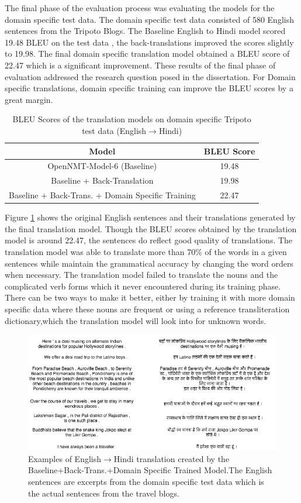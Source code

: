 The final phase of the evaluation process was evaluating the models for the domain specific test data. The domain specific test data consisted of 580 English sentences from the Tripoto Blogs. The Baseline English to Hindi model scored 19.48 BLEU on the test data , the back-translations improved the scores slightly to 19.98. The final domain specific translation model obtained a BLEU score of 22.47 which is a significant improvement. These results of the final phase of evaluation addressed the research question posed in the dissertation. For Domain specific translations, domain specific training can improve the BLEU scores by a great margin. 
\begin{table}[h!]
\centering
 \begin{tabular}{ |c|c| } 
  \hline Model & BLEU Score  \\ 
  \hline  OpenNMT-Model-6 (Baseline) &   19.48\\
  Baseline + Back-Translation & 19.98\\
  Baseline + Back-Trans. + Domain Specific Training & 22.47 \\
  \hline
 \end{tabular}
\caption{BLEU Scores of the translation models on domain specific Tripoto test data (English$\rightarrow$Hindi)}
\label{bleutable3}
\end{table}

Figure \ref{translations1} shows the original English sentences and their translations generated by the final translation model. Though the BLEU scores obtained by the translation model is around 22.47, the sentences do reflect good quality of translations. The translation model was able to translate more than 70\% of the words in a given sentences while maintain the grammatical accuracy by changing the word orders when necessary. The translation model failed to translate the nouns and the complicated verb forms which it never encountered during its training phase. There can be two ways to make it better, either by training it with more domain specific data where these nouns are frequent or using a reference transliteration dictionary,which the translation model will look into for unknown words.

\begin{figure}[H]
\includegraphics[width=\textwidth]{figures/translations1.png}
\caption{Examples of English$\rightarrow$Hindi translation created by the Baseline+Back-Trans.+Domain Specific Trained Model.The English sentences are excerpts from the domain specific test data which is the actual sentences from the travel blogs.}
\label{translations1}
\end{figure}

